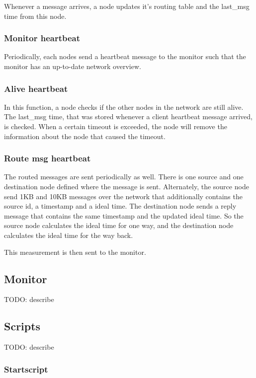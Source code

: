 \documentclass[paper=a4, fontsize=11pt]{scrartcl} %
\numberwithin{equation}{section} %
\numberwithin{figure}{section} %
\numberwithin{table}{section} %
\begin{document}
Whenever a message arrives, a node updates it's routing table and the last\_msg time from this node.

\subsubsection{Monitor heartbeat}
Periodically, each nodes send a heartbeat message to the monitor such that the monitor has an up-to-date network overview.

\subsubsection{Alive heartbeat}
In this function, a node checks if the other nodes in the network are still alive. The last\_msg time, that was stored whenever a client heartbeat message arrived, is checked. When a certain timeout is exceeded, the node will remove the information about the node that caused the timeout. 

\subsubsection{Route msg heartbeat}
The routed messages are sent periodically as well. There is one source and one destination node defined where the message is sent. Alternately, the source node send 1KB and 10KB messages over the network that additionally contains the source id, a timestamp and a ideal time. The destination node sends a reply message that contains the same timestamp and the updated ideal time. So the source node calculates the ideal time for one way, and the destination node calculates the ideal time for the way back.

This measurement is then sent to the monitor.

\subsection{Monitor}

TODO: describe

\subsection{Scripts}

TODO: describe

\subsubsection{Startscript}
\end{document}
